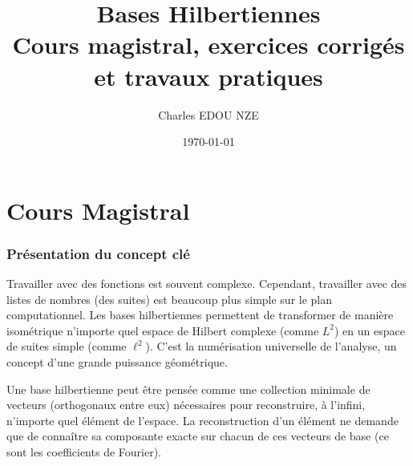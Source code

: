 \documentclass[11pt,a4paper]{article}
\title{\Huge Bases Hilbertiennes \\ \large Cours magistral, exercices corrigés et travaux pratiques}
\author{\Large Charles EDOU NZE}
\date{\today}
\begin{document}
\maketitle
\tableofcontents
\newpage

\part{Cours Magistral}


\section{Présentation du concept clé}

Travailler avec des fonctions est souvent complexe. Cependant, travailler avec des listes de nombres (des suites) est beaucoup plus simple sur le plan computationnel. Les bases hilbertiennes permettent de transformer de manière isométrique n'importe quel espace de Hilbert complexe (comme $L^2$) en un espace de suites simple (comme $\ell^2$). C'est la numérisation universelle de l'analyse, un concept d'une grande puissance géométrique.

Une base hilbertienne peut être pensée comme une collection minimale de vecteurs (orthogonaux entre eux) nécessaires pour reconstruire, à l'infini, n'importe quel élément de l'espace. La reconstruction d'un élément ne demande que de connaître sa composante exacte sur chacun de ces vecteurs de base (ce sont les coefficients de Fourier).

\begin{center}
\end{center}
\end{document}
